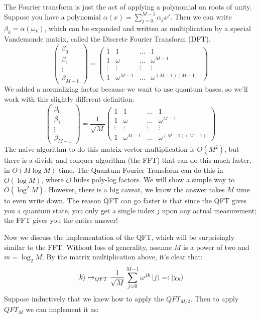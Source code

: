 The Fourier transform is just the act of applying a polynomial on roots of unity.
Suppose you have a polynomial $\alpha(x) = \sum_{j = 0}^{M - 1} \alpha_j x^j$. Then we can
write $\beta_k = \alpha(\omega_k)$, which can be expanded and written as multiplication
by a special Vandemonde matrix, called the Discrete Fourier Transform (DFT).
\[ \begin{pmatrix}
    \beta_0 \\ \beta_1 \\ \vdots \\ \beta_{M - 1}
\end{pmatrix} = \begin{pmatrix}
    1 & 1 & \dots & 1 \\
    1 & \omega & \dots & \omega^{M - 1} \\
    \vdots & \vdots & \vdots & \vdots \\
    1 & \omega^{M - 1} & \dots & \omega^{(M - 1)(M - 1)}
\end{pmatrix} \]
We added a normalizing factor because we want to 
use quantum bases, so we'll work with this slightly different definition:
\[ \begin{pmatrix}
    \beta_0 \\ \beta_1 \\ \vdots \\ \beta_{M - 1}
\end{pmatrix} = \frac{1}{\sqrt{M}} \begin{pmatrix}
    1 & 1 & \dots & 1 \\
    1 & \omega & \dots & \omega^{M - 1} \\
    \vdots & \vdots & \vdots & \vdots \\
    1 & \omega^{M - 1} & \dots & \omega^{(M - 1)(M - 1)}
\end{pmatrix} \]
The naive algorithm to do this matrix-vector multiplication is $O(M^2)$, but there is a
divide-and-conquer algorithm (the FFT) that can do this much faster, in $O(M \log M)$ time.
The Quantum Fourier Transform can do this in $\tilde{O}(\log M)$,
where $\tilde{O}$ hides poly-log factors. We will show a simple way to $O(\log^2 M)$. However,
there is a big caveat, we know the answer takes $M$ time to even write down.
The reason QFT can go faster is that since the QFT gives you a quantum state,
you only get a single index $j$ upon any actual measurement; the FFT gives you the entire answer!

Now we discuss the implementation of the QFT, which will be surprisingly similar to the FFT. Without loss of generality,
assume $M$ is a power of two and $m = \log_2 M$. By the matrix multiplication above, it's clear that:
\[\ket{k} \mapsto_{QFT} \frac{1}{\sqrt{M}} \sum_{j = 0}^{M - 1} \omega^{jk} \ket{j} =: \ket{\chi_k} \]
Suppose inductively that we knew how to apply the $QFT_{M/2}$. Then to apply $QFT_M$ we can implement it as:

